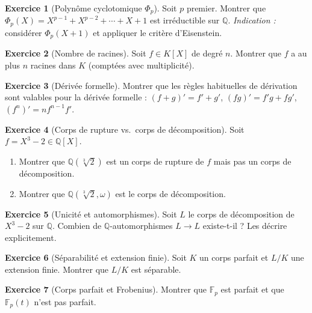 \documentclass[12pt,a4paper,openany]{book}
\theoremstyle{definition}
\newtheorem{exercice}{Exercice}[chapter]
\newcommand{\Q}{\mathbb{Q}}
\newcommand{\F}{\mathbb{F}}
\begin{document}
\begin{exercice}[Polynôme cyclotomique $\Phi_p$]\label{exo:cyclotomique}
Soit $p$ premier. Montrer que $\Phi_p(X) = X^{p-1} + X^{p-2} + \cdots + X + 1$
est irréductible sur $\Q$.
\emph{Indication :} considérer $\Phi_p(X+1)$ et appliquer le critère d'Eisenstein.
\end{exercice}

\begin{exercice}[Nombre de racines]\label{exo:nombre-racines}
Soit $f \in K[X]$ de degré $n$. Montrer que $f$ a au plus $n$ racines dans $K$
(comptées avec multiplicité).
\end{exercice}

\begin{exercice}[Dérivée formelle]\label{exo:derivee-formelle}
Montrer que les règles habituelles de dérivation sont valables pour la dérivée
formelle : $(f+g)' = f' + g'$, $(fg)' = f'g + fg'$, $(f^n)' = nf^{n-1}f'$.
\end{exercice}

\begin{exercice}[Corps de rupture vs.\ corps de décomposition]\label{exo:rupture-vs-decomp}
Soit $f = X^3 - 2 \in \Q[X]$.
\begin{enumerate}[label=(\alph*)]
  \item Montrer que $\Q(\sqrt[3]{2})$ est un corps de rupture de $f$ mais pas
    un corps de décomposition.
  \item Montrer que $\Q(\sqrt[3]{2}, \omega)$ est le corps de décomposition.
\end{enumerate}
\end{exercice}

\begin{exercice}[Unicité et automorphismes]\label{exo:unicite-auto}
Soit $L$ le corps de décomposition de $X^3 - 2$ sur $\Q$. Combien de
$\Q$-automorphismes $L \to L$ existe-t-il ? Les décrire explicitement.
\end{exercice}

\begin{exercice}[Séparabilité et extension finie]\label{exo:sep-ext-finie}
Soit $K$ un corps parfait et $L/K$ une extension finie. Montrer que $L/K$ est
séparable.
\end{exercice}

\begin{exercice}[Corps parfait et Frobenius]\label{exo:parfait-frobenius}
Montrer que $\F_p$ est parfait et que $\F_p(t)$ n'est pas parfait.
\end{exercice}
\end{document}
